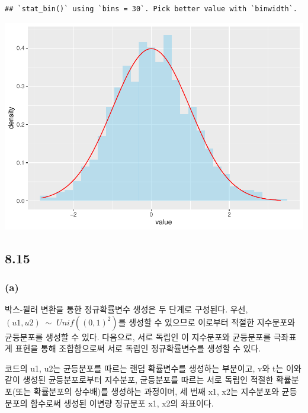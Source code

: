 \documentclass[
]{article}
\begin{document}
\begin{verbatim}
## `stat_bin()` using `bins = 30`. Pick better value with `binwidth`.
\end{verbatim}

\includegraphics{Bayes_stat_hw2_files/figure-latex/unnamed-chunk-19-1.pdf}

\subsection{8.15}\label{section-8}

\subsubsection{(a)}\label{a-4}

박스-뮐러 변환을 통한 정규확률변수 생성은 두 단계로 구성된다. 우선,
\((u1, u2) \;{\sim}\; Unif((0, 1)^2)\)를 생성할 수 있으므로 이로부터
적절한 지수분포와 균등분포를 생성할 수 있다. 다음으로, 서로 독립인 이
지수분포와 균등분포를 극좌표계 표현을 통해 조합함으로써 서로 독립인
정규확률변수를 생성할 수 있다.

코드의 u1, u2는 균등분포를 따르는 랜덤 확률변수를 생성하는 부분이고, v와
t는 이와 같이 생성된 균등분포로부터 지수분포, 균등분포를 따르는 서로
독립인 적절한 확률분포(또는 확률분포의 상수배)를 생성하는 과정이며, 세
번째 x1, x2는 지수분포와 균등분포의 함수로써 생성된 이변량 정규분포 x1,
x2의 좌표이다.
\end{document}
